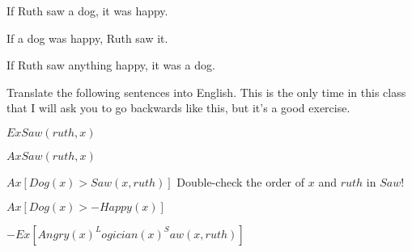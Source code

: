 If Ruth saw a dog, it was happy.
	\answer
	$ $
	\endanswer

If a dog was happy, Ruth saw it.
	\answer
	$ $
	\endanswer

If Ruth saw anything happy, it was a dog.
	\answer
	$ $
	\endanswer

\endproblems

Translate the following sentences into English. This is the only time in this class that I will ask you to go backwards like this, but it's a good exercise.

\problems
{}
$ Ex Saw(ruth,x) $
	\answer
	 
	\endanswer

$ Ax Saw(ruth,x) $
	\answer
	 
	\endanswer

$ Ax[Dog(x) > Saw(x,ruth)] $
\Hint Double-check the order of $x$ and $ruth$ in $Saw$!
	\answer
	 
	\endanswer

$ Ax[Dog(x) > -Happy(x)] $
	\answer
	 
	\endanswer

$ -Ex[Angry(x) ^ Logician(x) ^ Saw(x,ruth)] $
	\answer
	 
	\endanswer

\endproblems
\bye
